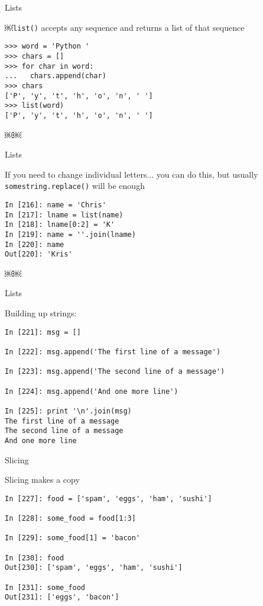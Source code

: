 \documentclass{beamer}
\begin{document}
\begin{frame}[fragile]{Lists}

{\large ￼\verb|list()| accepts any sequence and returns a list of that sequence}
\begin{verbatim}
>>> word = 'Python '
>>> chars = []
>>> for char in word:
...   chars.append(char)
>>> chars
['P', 'y', 't', 'h', 'o', 'n', ' ']
>>> list(word)
['P', 'y', 't', 'h', 'o', 'n', ' ']
\end{verbatim}

\end{frame} 
￼￼
\begin{frame}[fragile]{Lists}

{\large If you need to change individual letters... you can do this,
but usually \verb|somestring.replace()| will be enough }

\begin{verbatim}
In [216]: name = 'Chris'
In [217]: lname = list(name)
In [218]: lname[0:2] = 'K'
In [219]: name = ''.join(lname)
In [220]: name
Out[220]: 'Kris'
\end{verbatim}

\end{frame} 
￼￼
\begin{frame}[fragile]{Lists}

{\large Building up strings:}

\begin{verbatim}
In [221]: msg = []

In [222]: msg.append('The first line of a message')

In [223]: msg.append('The second line of a message')

In [224]: msg.append('And one more line')

In [225]: print '\n'.join(msg)
The first line of a message
The second line of a message
And one more line
\end{verbatim}

\end{frame} 

\begin{frame}[fragile]{Slicing}

{\large Slicing makes a copy}

\begin{verbatim}
In [227]: food = ['spam', 'eggs', 'ham', 'sushi']

In [228]: some_food = food[1:3]

In [229]: some_food[1] = 'bacon'

In [230]: food
Out[230]: ['spam', 'eggs', 'ham', 'sushi']

In [231]: some_food
Out[231]: ['eggs', 'bacon']
\end{verbatim}

\end{frame}
\end{document}
